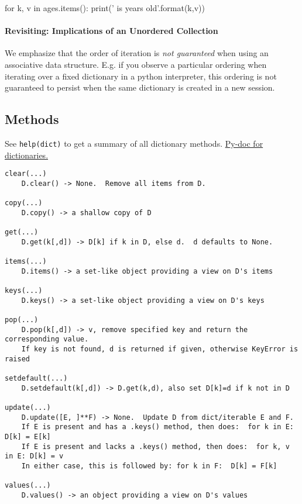 \documentclass[12pt,letterpaper,twoside]{article}
\begin{document}
\begin{python}
for k, v in ages.items():
    print('{} is {} years old'.format(k,v))
\end{python}

\paragraph{Revisiting: Implications of an Unordered Collection}
We emphasize that the order of iteration is \emph{not guaranteed} when using an associative
data structure. E.g. if you observe a particular ordering when iterating over a fixed
dictionary in a python interpreter, this ordering is not guaranteed to persist when
the same dictionary is created in a new session.

\vspace{-10pt}
\subsection{Methods}
See \texttt{help(dict)} to get a summary of all dictionary methods. \href{https://docs.python.org/3/tutorial/datastructures.html#dictionaries}{Py-doc for dictionaries.}

{
\footnotesize
\begin{verbatim}
clear(...)
    D.clear() -> None.  Remove all items from D.

copy(...)
    D.copy() -> a shallow copy of D

get(...)
    D.get(k[,d]) -> D[k] if k in D, else d.  d defaults to None.

items(...)
    D.items() -> a set-like object providing a view on D's items

keys(...)
    D.keys() -> a set-like object providing a view on D's keys

pop(...)
    D.pop(k[,d]) -> v, remove specified key and return the corresponding value.
    If key is not found, d is returned if given, otherwise KeyError is raised

setdefault(...)
    D.setdefault(k[,d]) -> D.get(k,d), also set D[k]=d if k not in D

update(...)
    D.update([E, ]**F) -> None.  Update D from dict/iterable E and F.
    If E is present and has a .keys() method, then does:  for k in E: D[k] = E[k]
    If E is present and lacks a .keys() method, then does:  for k, v in E: D[k] = v
    In either case, this is followed by: for k in F:  D[k] = F[k]

values(...)
    D.values() -> an object providing a view on D's values
\end{verbatim}
}
\end{document}
